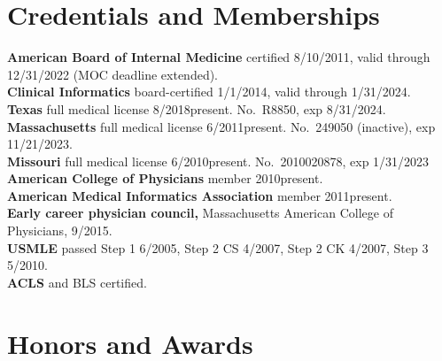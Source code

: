 \documentclass[10pt]{article}
\begin{document}
\section*{Credentials and Memberships}
\textbf{American Board of Internal Medicine} certified 8/10/2011,
valid through 12/31/2022 (MOC deadline extended).\\
\textbf{Clinical Informatics} board-certified 1/1/2014, valid through
1/31/2024.\\
\textbf{Texas} full medical license 8/2018\ndash{}present. No.\ R8850,
exp 8/31/2024.\\
\textbf{Massachusetts} full medical license 6/2011\ndash{}present.
No.\ 249050 (inactive), exp 11/21/2023.\\
\textbf{Missouri} full medical license 6/2010\ndash{}present.
No.\ 2010020878, exp 1/31/2023\\
\textbf{American College of Physicians} member 2010\ndash{}present.\\
\textbf{American Medical Informatics Association} member
2011\ndash{}present.\\
\textbf{Early career physician council,} Massachusetts American
College of Physicians, 9/\ndash{}2015.\\
\textbf{USMLE} passed Step 1 6/2005, Step 2 CS 4/2007, Step 2 CK
4/2007, Step 3 5/2010.\\
\textbf{ACLS} and BLS certified.




\section*{Honors and Awards}
\end{document}
